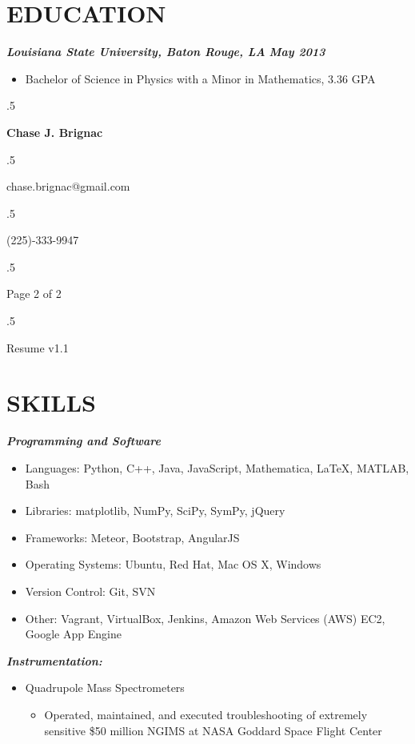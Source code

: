 \documentclass{res}
\begin{document}
\begin{resume}
\section{EDUCATION}
	{\bfseries {\em  Louisiana State University, Baton Rouge, LA}} \hfill   {\bfseries {\em May 2013}}\
                \begin{itemize}  \itemsep -14pt
                \item Bachelor of Science in Physics with a Minor in Mathematics, 3.36 GPA\\
                \end{itemize}


\newpage

 \moveleft.5\hoffset\centerline{\large\bf Chase J. Brignac}
\moveleft.5\hoffset\centerline{chase.brignac@gmail.com}
\moveleft.5\hoffset\centerline{(225)-333-9947}
\moveleft.5\hoffset\centerline{Page 2 of 2}
\moveleft.5\hoffset\centerline{Resume v1.1}


\section{SKILLS}
	{\bfseries {\em Programming and Software}}
 		\begin{itemize} 
		\item Languages: Python, C++, Java, JavaScript, Mathematica, \LaTeX{}, MATLAB, Bash
		\item Libraries: matplotlib, NumPy, SciPy, SymPy, jQuery
		\item Frameworks: Meteor, Bootstrap, AngularJS
		\item Operating Systems: Ubuntu, Red Hat, Mac OS X, Windows
		\item Version Control: Git, SVN
		\item Other: Vagrant, VirtualBox, Jenkins, Amazon Web Services (AWS) EC2, Google App Engine
		\end{itemize}
	 {\bfseries {\em Instrumentation:}}
	 	\begin{itemize}
	 	\item Quadrupole Mass Spectrometers
	 	\begin{itemize}
	 	\item Operated, maintained, and executed troubleshooting of extremely sensitive \$50 million NGIMS at NASA Goddard Space Flight Center
	 	\end{itemize}


\end{itemize}
\end{resume}
\end{document}
